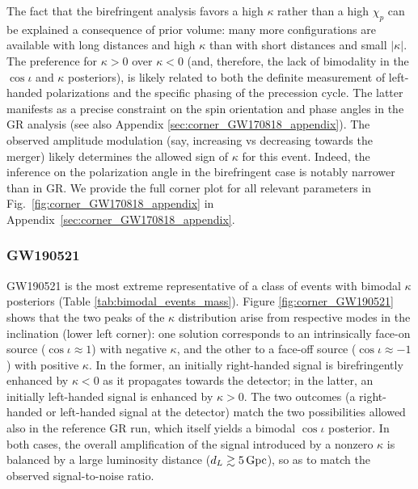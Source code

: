 \documentclass[aps,prd,twocolumn,superscriptaddress,preprintnumbers,floatfix,nofootinbib]{revtex4-2}
\begin{document}
The fact that the birefringent analysis favors a high $\kappa$ rather than a high $\chi_p$ can be explained a consequence of prior volume: many more configurations are available with long distances and high $\kappa$ than with short distances and small $|\kappa|$.
The preference for $\kappa > 0$ over $\kappa < 0$ (and, therefore, the lack of bimodality in the $\cos\iota$ and $\kappa$ posteriors), is likely related to both the definite measurement of left-handed polarizations and the specific phasing of the precession cycle.
The latter manifests as a precise constraint on the spin orientation and phase angles in the \ac{GR} analysis \cite{Varma:2021csh} (see also Appendix \ref{sec:corner_GW170818_appendix}).
The observed amplitude modulation (say, increasing vs decreasing towards the merger) likely determines the allowed sign of $\kappa$ for this event.
Indeed, the inference on the polarization angle in the birefringent case is notably narrower than in \ac{GR}.
We provide the full corner plot for all relevant parameters in Fig.~\ref{fig:corner_GW170818_appendix} in Appendix~\ref{sec:corner_GW170818_appendix}.

\subsubsection{GW190521}
\label{sec:GW190521}

GW190521 is the most extreme representative of a class of events with bimodal $\kappa$ posteriors (Table \ref{tab:bimodal_events_mass}).
Figure \ref{fig:corner_GW190521} shows that the two peaks of the $\kappa$ distribution arise from respective modes in the inclination (lower left corner): one solution corresponds to an intrinsically face-on source ($\cos\iota \approx 1$) with negative $\kappa$, and the other to a face-off source ($\cos\iota \approx -1$) with positive $\kappa$.
In the former, an initially right-handed signal is birefringently enhanced by $\kappa < 0$ as it propagates towards the detector; in the latter, an initially left-handed signal is enhanced by $\kappa > 0$.
The two outcomes (a right-handed or left-handed signal at the detector) match the two possibilities allowed also in the reference \ac{GR} run, which itself yields a bimodal $\cos\iota$ posterior.
In both cases, the overall amplification of the signal introduced by a nonzero $\kappa$ is balanced by a large luminosity distance ($d_L \gtrsim 5 \, {\rm Gpc}$), so as to match the observed signal-to-noise ratio.
\end{document}
